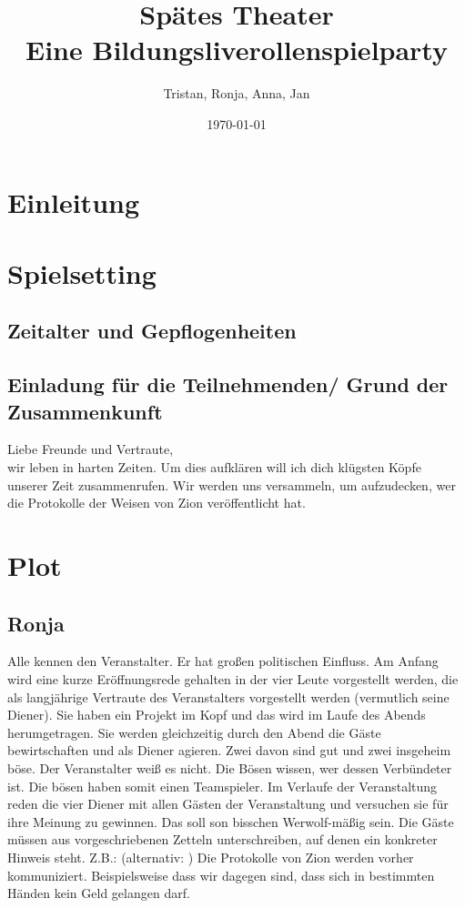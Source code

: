 \documentclass[12pt, a4paper, openany]{report}
\title{
    {\textbf{Spätes Theater}}\\
    {\large{Eine Bildungsliverollenspielparty}}\\
}
\author{Tristan, Ronja, Anna, Jan}
\date{\today}
\begin{document}
\maketitle
\frontmatter
\tableofcontents
\mainmatter

\chapter{Einleitung}

\chapter{Spielsetting}

\section{Zeitalter und Gepflogenheiten}

\section{Einladung für die Teilnehmenden/ Grund der Zusammenkunft}
Liebe Freunde und Vertraute,\\
wir leben in harten Zeiten. 
Um dies aufklären will ich dich klügsten Köpfe unserer Zeit zusammenrufen. 
Wir werden uns versammeln, um aufzudecken, wer die Protokolle der Weisen von Zion veröffentlicht hat. 

\chapter{Plot}

\section{Ronja}
Alle kennen den Veranstalter. 
Er hat großen politischen Einfluss. 
Am Anfang wird eine kurze Eröffnungsrede gehalten in der vier Leute vorgestellt werden, die als langjährige Vertraute des Veranstalters vorgestellt werden (vermutlich seine Diener).
Sie haben ein Projekt im Kopf und das wird im Laufe des Abends herumgetragen. 
Sie werden gleichzeitig durch den Abend die Gäste bewirtschaften und als Diener agieren.
Zwei davon sind gut und zwei insgeheim böse. 
Der Veranstalter weiß es nicht. 
Die Bösen wissen, wer dessen Verbündeter ist.
Die bösen haben somit einen Teamspieler. 
Im Verlaufe der Veranstaltung reden die vier Diener mit allen Gästen der Veranstaltung und versuchen sie für ihre Meinung zu gewinnen. 
Das soll son bisschen Werwolf-mäßig sein. 
Die Gäste müssen aus vorgeschriebenen Zetteln unterschreiben, auf denen ein konkreter Hinweis steht.
Z.B.:  (alternativ: )
Die Protokolle von Zion werden vorher kommuniziert. 
Beispielsweise dass wir dagegen sind, dass sich in bestimmten Händen kein Geld gelangen darf.\\
\end{document}
